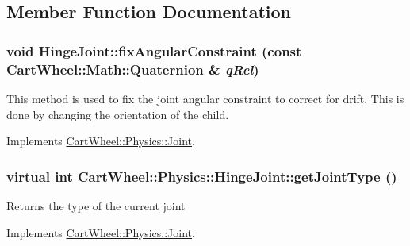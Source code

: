 \subsection{Member Function Documentation}
\hypertarget{classCartWheel_1_1Physics_1_1HingeJoint_a0245e9da2588e69062102bb6750906d0}{
\subsubsection[{fixAngularConstraint}]{\setlength{\rightskip}{0pt plus 5cm}void HingeJoint::fixAngularConstraint (const {\bf CartWheel::Math::Quaternion} \& {\em qRel})}}
\label{classCartWheel_1_1Physics_1_1HingeJoint_a0245e9da2588e69062102bb6750906d0}
This method is used to fix the joint angular constraint to correct for drift. This is done by changing the orientation of the child. 

Implements \hyperlink{classCartWheel_1_1Physics_1_1Joint_ab14f1e87562d9f5993504621d2cf3569}{CartWheel::Physics::Joint}.

\hypertarget{classCartWheel_1_1Physics_1_1HingeJoint_ac235a55558abc285ec5bc3bd19e3a2da}{
\subsubsection[{getJointType}]{\setlength{\rightskip}{0pt plus 5cm}virtual int CartWheel::Physics::HingeJoint::getJointType ()}}
\label{classCartWheel_1_1Physics_1_1HingeJoint_ac235a55558abc285ec5bc3bd19e3a2da}
Returns the type of the current joint 

Implements \hyperlink{classCartWheel_1_1Physics_1_1Joint_a6940878e260534a3803b14aa697b88f7}{CartWheel::Physics::Joint}.

